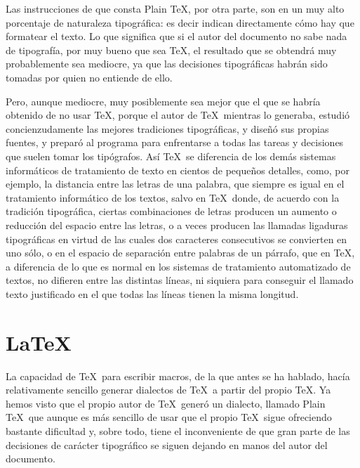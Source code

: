 		Las instrucciones de que consta Plain \TeX, por otra parte, son en un muy alto porcentaje de naturaleza tipográfica: es decir indican directamente cómo hay que formatear el texto. Lo que significa que si el autor del documento no sabe nada de tipografía, por muy bueno que sea \TeX, el resultado que se obtendrá muy probablemente sea mediocre, ya que las decisiones tipográficas habrán sido tomadas por quien no entiende de ello.
		
		Pero, aunque mediocre, muy posiblemente sea mejor que el que se habría obtenido de no usar \TeX, porque el autor de \TeX\ mientras lo generaba, estudió concienzudamente las mejores tradiciones tipográficas, y diseñó sus propias fuentes, y preparó al programa para enfrentarse a todas las tareas y decisiones que suelen tomar los tipógrafos. Así \TeX\ se diferencia de los demás sistemas informáticos de tratamiento de texto en cientos de pequeños detalles, como, por ejemplo, la distancia entre las letras de una palabra, que siempre es igual en el tratamiento informático de los textos, salvo en \TeX\ donde, de acuerdo con la tradición tipográfica, ciertas combinaciones de letras producen un aumento o reducción del espacio entre las letras, o a veces producen las llamadas ligaduras tipográficas en virtud de las cuales dos caracteres consecutivos se convierten en uno sólo, o en el espacio de separación entre palabras de un párrafo, que en \TeX, a diferencia de lo que es normal en los sistemas de tratamiento automatizado de textos, no difieren entre las distintas líneas, ni siquiera para conseguir el llamado texto justificado en el que todas las líneas tienen la misma longitud.
		
	\section{\LaTeX}
		
		La capacidad de \TeX\ para escribir macros, de la que antes se ha hablado, hacía relativamente sencillo generar dialectos de \TeX\ a partir del propio \TeX. Ya hemos visto que el propio autor de \TeX\ generó un dialecto, llamado Plain \TeX\ que aunque es más sencillo de usar que el propio \TeX\, sigue ofreciendo bastante dificultad y, sobre todo, tiene el inconveniente de que gran parte de las decisiones de carácter tipográfico se siguen dejando en manos del autor del documento.
		

